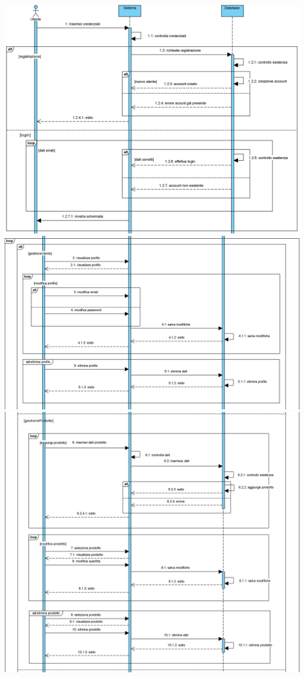 \documentclass[a4paper, titlepage]{article}
\begin{document}
\newpage
\includegraphics[scale=0.30]{Immagini/Sequence Diagram_Brew Day!_1.png}
\includegraphics[scale=0.30]{Immagini/Sequence Diagram_Brew Day!_2.png}
\includegraphics[scale=0.30]{Immagini/Sequence Diagram_Brew Day!_3.png}
\end{document}
